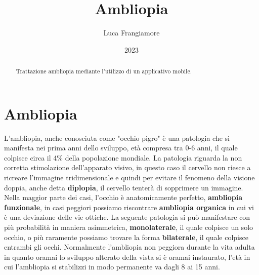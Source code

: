\documentclass[10pt,a4paper]{article}
\title{Ambliopia}
\author{Luca Frangiamore}
\date{2023}
\begin{document}
	
	\maketitle
	\tableofcontents{\tiny }
	
	
	\begin{abstract}
		Trattazione ambliopia mediante l'utilizzo di un applicativo mobile.
	\end{abstract} 
    \newpage
    \null
    \newpage
    
	 
	\section {Ambliopia}
	L'ambliopia, anche conosciuta come "occhio pigro" è una patologia che si manifesta nei prima anni dello sviluppo, età compresa tra 0-6 anni, il quale colpisce circa il 4\% della popolazione mondiale.
	La patologia riguarda la non corretta stimolazione dell'apparato visivo, in questo caso il cervello non riesce a ricreare l'immagine tridimensionale e quindi per evitare il fenomeno della visione doppia, anche detta \textbf{diplopia}, il cervello tenterà di sopprimere un immagine.
	Nella maggior parte dei casi, l'occhio è anatomicamente perfetto, \textbf{ambliopia funzionale}, in casi peggiori possiamo riscontrare \textbf{ambliopia organica} in cui vi è una deviazione delle vie ottiche.
	La seguente patologia si può manifestare con più probabilità in maniera asimmetrica, \textbf{monolaterale}, il quale colpisce un solo occhio, o più raramente possiamo trovare la forma \textbf{bilaterale}, il quale colpisce entrambi gli occhi.
	Normalmente l'ambliopia non peggiora durante la vita adulta in quanto oramai lo sviluppo alterato della vista si è oramai instaurato, l'età in cui l'ambliopia si stabilizzi in modo permanente va dagli 8 ai 15 anni.
\end{document}
